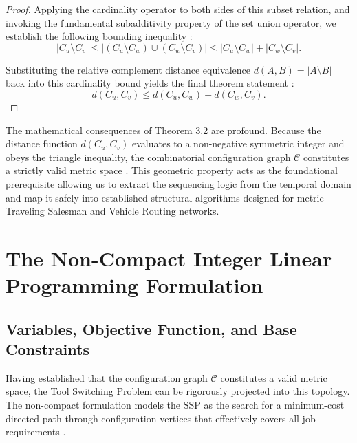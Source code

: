 \documentclass[11pt, a4paper]{book}
\begin{document}
\begin{proof}
		Applying the cardinality operator to both sides of this subset relation, and invoking the fundamental subadditivity property of the set union operator, we establish the following bounding inequality \cite{Colares2026}: %
		\begin{equation}
			|C_u \setminus C_v| \le |(C_u \setminus C_w) \cup (C_w \setminus C_v)| \le |C_u \setminus C_w| + |C_w \setminus C_v|.
		\end{equation}
		
		Substituting the relative complement distance equivalence $d(A, B) = |A \setminus B|$ back into this cardinality bound yields the final theorem statement \cite{Colares2026}: %
		\begin{equation}
			d(C_u, C_v) \le d(C_u, C_w) + d(C_w, C_v). \label{eq:triangle_inequality}
		\end{equation}
	\end{proof}
	
	The mathematical consequences of Theorem 3.2 are profound. Because the distance function $d(C_u, C_v)$ evaluates to a non-negative symmetric integer and obeys the triangle inequality, the combinatorial configuration graph $\mathcal{C}$ constitutes a strictly valid metric space \cite{Colares2026}. %
	This geometric property acts as the foundational prerequisite allowing us to extract the sequencing logic from the temporal domain and map it safely into established structural algorithms designed for metric Traveling Salesman and Vehicle Routing networks.
	
	\section{The Non-Compact Integer Linear Programming Formulation}
	
	\subsection{Variables, Objective Function, and Base Constraints}
	
	Having established that the configuration graph $\mathcal{C}$ constitutes a valid metric space, the Tool Switching Problem can be rigorously projected into this topology. The non-compact formulation models the SSP as the search for a minimum-cost directed path through configuration vertices that effectively covers all job requirements \cite{Colares2026}. %
	
\end{document}
